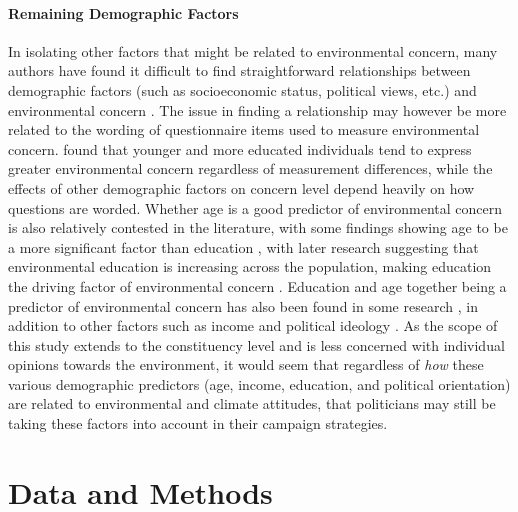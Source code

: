 \documentclass[12pt,letterpaper]{article}
\begin{document}
\paragraph{Remaining Demographic Factors}

In isolating other factors that might be related to environmental concern, many authors have found it difficult to find straightforward relationships between demographic factors (such as socioeconomic status, political views, etc.) and environmental concern \autocite{dietzSocialStructuralSocial1998,samdahlSocialDeterminantsEnvironmental1989,giffordPersonalSocialFactors2014}. The issue in finding a relationship may however be more related to the wording of questionnaire items used to measure environmental concern. \textcite{klinebergDemographicPredictorsEnvironmental1998} found that younger and more educated individuals tend to express greater environmental concern regardless of measurement differences, while the effects of other demographic factors on concern level depend heavily on how questions are worded. Whether age is a good predictor of environmental concern is also relatively contested in the literature, with some findings showing age to be a more significant factor than education \autocite{buttelAgeEnvironmentalConcern1979}, with later research suggesting that environmental education is increasing across the population, making education the driving factor of environmental concern \autocite{howellChangingFaceEnvironmental1992}. Education and age together being a predictor of environmental concern has also been found in some research \autocite{arcuryEnvironmentalWorldviewResponse1990}, in addition to other factors such as income \autocite{gambaFactorsInfluencingCommunity1994} and political ideology \autocite{dunlapImpactPoliticalOrientation1975}. As the scope of this study extends to the constituency level and is less concerned with individual opinions towards the environment, it would seem that regardless of \textit{how} these various demographic predictors (age, income, education, and political orientation) are related to environmental and climate attitudes, that politicians may still be taking these factors into account in their campaign strategies.

	
	\newpage
	

	
	\section{Data and Methods}
\end{document}
